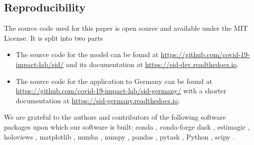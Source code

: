 \subsection{Reproducibility}
\label{subsec:code}

The source code used for this paper is open source and available under the MIT License.
It is split into two parts
\begin{itemize}
    \item The source code for the model can be found at
   \href{https://github.com/covid-19-impact-lab/sid/}{https://github.com/covid-19-impact-lab/sid/}
   and its documentation at
   \href{https://sid-dev.readthedocs.io}{https://sid-dev.readthedocs.io}.
   \item The source code for the application to Germany can be found at
   \href{https://github.com/covid-19-impact-lab/sid-germany/}{https://github.com/covid-19-impact-lab/sid-germany/}
   with a shorter documentation at
   \href{https://sid-germany.readthedocs.io}{https://sid-germany.readthedocs.io}.
\end{itemize} 

We are grateful to the authors and contributors of the following software packages upon
which our software is built: conda \cite{Anaconda2016}, conda-forge
\cite{CondaForge2015} dask \cite{Rocklin2015}, estimagic \cite{Gabler2020a}, holoviews
\cite{Stevens2015}, matplotlib \cite{Hunter2007}, numba \cite{Lam2015}, numpy
\cite{Harris2020}, pandas \cite{Reback2020,McKinney2010}, pytask \cite{Raabe2020},
Python \cite{VanRossum1995}, scipy \cite{Virtanen2020}.
